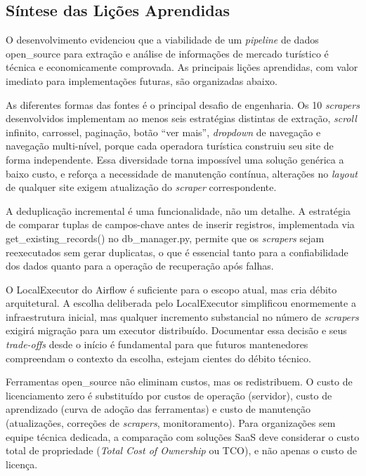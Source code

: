 \subsection{Síntese das Lições Aprendidas}

O desenvolvimento evidenciou que a viabilidade de um \textit{pipeline}
de dados \acs{open_source} para extração e análise de informações de mercado turístico
é técnica e economicamente comprovada. As principais lições aprendidas, com valor
imediato para implementações futuras, são organizadas abaixo.

As diferentes formas das fontes é o principal desafio de engenharia. Os 10
\textit{scrapers} desenvolvidos implementam ao menos seis estratégias distintas de
extração, \textit{scroll} infinito, carrossel, paginação, botão ``ver mais'',
\textit{dropdown} de navegação e navegação multi-nível, porque cada operadora turística
construiu seu site de forma independente. Essa diversidade torna impossível uma solução
genérica a baixo custo, e reforça a necessidade de manutenção contínua, alterações no \textit{layout}
de qualquer site exigem atualização do \textit{scraper} correspondente.

A deduplicação incremental é uma funcionalidade, não um detalhe. A estratégia
de comparar tuplas de campos-chave antes de inserir registros, implementada via
get\_existing\_records() no db\_manager.py, permite que os
\textit{scrapers} sejam reexecutados sem gerar duplicatas, o que é essencial tanto para
a confiabilidade dos dados quanto para a operação de recuperação após falhas.

O LocalExecutor do Airflow é suficiente para o escopo atual, mas cria débito
arquitetural. A escolha deliberada pelo LocalExecutor simplificou enormemente a
infraestrutura inicial, mas qualquer incremento substancial no número de
\textit{scrapers} exigirá migração para um executor distribuído. Documentar essa decisão
e seus \textit{trade-offs} desde o início é fundamental para que futuros mantenedores
compreendam o contexto da escolha, estejam cientes do débito técnico.

Ferramentas \acs{open_source} não eliminam custos, mas os redistribuem. O
custo de licenciamento zero é substituído por custos de operação (servidor), custo de
aprendizado (curva de adoção das ferramentas) e custo de manutenção (atualizações,
correções de \textit{scrapers}, monitoramento). Para organizações sem equipe técnica
dedicada, a comparação com soluções SaaS deve considerar o custo total de propriedade
(\textit{Total Cost of Ownership} ou TCO), e não apenas o custo de licença.

